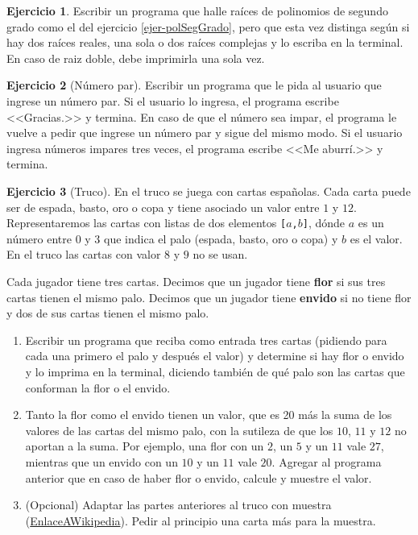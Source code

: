 \documentclass[a4paper,12pt]{book}
\theoremstyle{definition}
\newtheorem{ejercicio}{Ejercicio}
\begin{document}
	\begin{ejercicio}
		Escribir un programa que halle raíces de polinomios de segundo grado como el del ejercicio \ref{ejer-polSegGrado}, pero que esta vez distinga según si hay dos raíces reales, una sola o dos raíces complejas y lo escriba en la terminal. En caso de raiz doble, debe imprimirla una sola vez.
	\end{ejercicio}
	
	\begin{ejercicio}[Número par]
		Escribir un programa que le pida al usuario que ingrese un número par. Si el usuario lo ingresa, el programa escribe <<Gracias.>> y termina. En caso de que el número sea impar, el programa le vuelve a pedir que ingrese un número par y sigue del mismo modo. Si el usuario ingresa números impares tres veces, el programa escribe <<Me aburrí.>> y termina.
	\end{ejercicio}
	
	\begin{ejercicio}[Truco]
		En el truco se juega con cartas españolas. Cada carta puede ser de espada, basto, oro o copa y tiene asociado un valor entre $1$ y $12$. Representaremos las cartas con listas de dos elementos {\tt [$a$,$b$]}, dónde $a$ es un número entre $0$ y $3$ que indica el palo (espada, basto, oro o copa) y $b$ es el valor. En el truco las cartas con valor $8$ y $9$ no se usan.
		
		Cada jugador tiene tres cartas. Decimos que un jugador tiene {\bf flor} si sus tres cartas tienen el mismo palo. Decimos que un jugador tiene {\bf envido} si no tiene flor y dos de sus cartas tienen el mismo palo.
		
		\begin{enumerate}
			\item Escribir un programa que reciba como entrada tres cartas (pidiendo para cada una primero el palo y después el valor) y determine si hay flor o envido y lo imprima en la terminal, diciendo también de qué palo son las cartas que conforman la flor o el envido.
			
			\item Tanto la flor como el envido tienen un valor, que es 20 más la suma de los valores de las cartas del mismo palo, con la sutileza de que los $10$, $11$ y $12$ no aportan a la suma. Por ejemplo, una flor con un $2$, un $5$ y un $11$ vale $27$, mientras que un envido con un $10$ y un $11$ vale $20$. Agregar al programa anterior que en caso de haber flor o envido, calcule y muestre el valor.
			
			\item (Opcional) Adaptar las partes anteriores al truco con muestra (\href{https://es.wikipedia.org/wiki/Truco_uruguayo}{EnlaceAWikipedia}). Pedir al principio una carta más para la muestra.
		\end{enumerate}
	\end{ejercicio}
	
\end{document}
